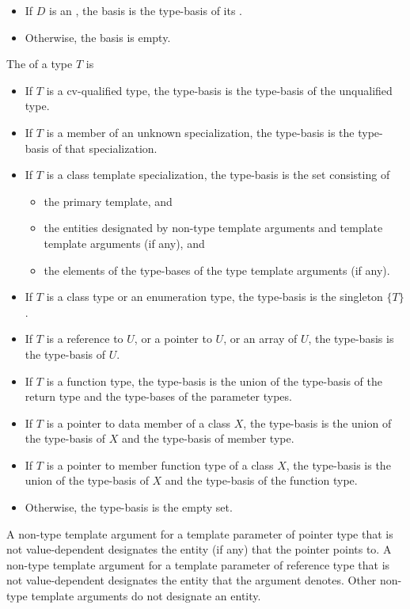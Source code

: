 \begin{std.txt}
\begin{itemize}
\item If $D$ is an ,
the basis is the type-basis of its .

\item Otherwise, the basis is empty.
\end{itemize}

The  of a type $T$ is
\begin{itemize}
\item If $T$ is a cv-qualified type, the type-basis is the type-basis of
the unqualified type.
\item If $T$ is a member of an unknown specialization, the type-basis
is the type-basis of that specialization.
\item If $T$ is a class template specialization, the type-basis
is the set consisting of
\begin{itemize}
\item the primary template, and
\item the entities designated by
non-type template arguments and
template template arguments (if any), and
\item the elements of the type-bases
of the type template arguments (if any).
\end{itemize}
\item If $T$ is a class type or an enumeration type, 
the type-basis is the singleton $\{ T \}$.
\item If $T$ is a reference to $U$, or a pointer to $U$, or an array of $U$, the
type-basis is the type-basis of $U$.
\item If $T$ is a function type, the type-basis is the union of the
type-basis of the return type and the type-bases of the parameter types.
\item If $T$ is a pointer to data member of a class $X$, the type-basis is
the union of the type-basis of $X$ and the type-basis of member type.
\item If $T$ is a pointer to member function type of a class $X$, the
type-basis is the union of the type-basis of $X$ and the type-basis of
the function type.
\item Otherwise, the type-basis is the empty set.
\end{itemize}

A non-type template argument for a template parameter of pointer type 
that is not value-dependent designates the entity (if any) that the
pointer points to.
A non-type template argument for a template parameter of reference type
that is not value-dependent designates the entity that the argument
denotes.
Other non-type template arguments do not designate an entity.


\end{std.txt}
